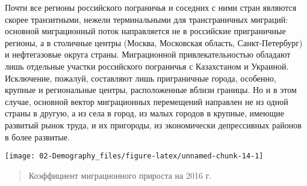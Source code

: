 \documentclass[]{book}
\begin{document}
Почти все регионы российского пограничья и соседних с ними стран
являются скорее транзитными, нежели терминальными для трансграничных
миграций: основной миграционный поток направляется не в российские
приграничные регионы, а в столичные центры (Москва, Московская область,
Санкт-Петербург) и нефтегазовые округа страны. Миграционной
привлекательностью обладают лишь отдельные участки российского
пограничья с Казахстаном и Украиной. Исключение, пожалуй, составляют
лишь приграничные города, особенно, крупные и региональные центры,
расположенные вблизи границы. Но и в этом случае, основной вектор
миграционных перемещений направлен не из одной страны в другую, а из
села в город, из малых городов в крупные, имеющие развитый рынок труда,
и их пригороды, из экономически депрессивных районов в более развитые.

\texttt{[image: 02-Demography\_files/figure-latex/unnamed-chunk-14-1]}

\begin{quote}
Коэффициент миграционного прироста на 2016 г.
\end{quote}


\end{document}
